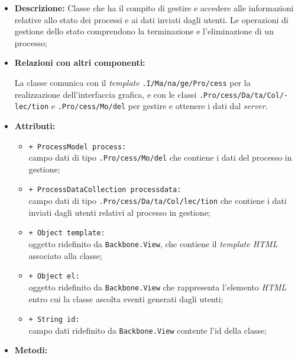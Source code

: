 \begin{flushleft}
\begin{itemize}
\item \textbf{Descrizione:} Classe che ha il compito di gestire e accedere alle informazioni relative allo stato dei processi e ai dati inviati dagli utenti. Le operazioni di gestione dello stato comprendono la terminazione e l'eliminazione di un processo;
\item \textbf{Relazioni con altri componenti:}
\begin{sloppypar}
La classe comunica con il \textit{template} \texttt{\viewAdmin{}.I\fshyp{}Ma\fshyp{}na\fshyp{}ge\fshyp{}Pro\fshyp{}cess} per la realizzazione dell'interfaccia grafica, e con le classi \texttt{\collection{}.Pro\fshyp{}cess\fshyp{}Da\fshyp{}ta\fshyp{}Col\fshyp{}lec\fshyp{}tion} e \texttt{\model{}.Pro\fshyp{}cess\fshyp{}Mo\fshyp{}del} per gestire e ottenere i dati dal \textit{server}.
\end{sloppypar}
\item \textbf{Attributi:}
\begin{sloppypar}
\begin{itemize}
\item \texttt{+ ProcessModel process:}\\ campo dati di tipo \texttt{\model{}.Pro\fshyp{}cess\fshyp{}Mo\fshyp{}del} che contiene i dati del processo in gestione;
\item \texttt{+ ProcessDataCollection processdata:}\\ campo dati di tipo \texttt{\collection{}.Pro\fshyp{}cess\fshyp{}Da\fshyp{}ta\fshyp{}Col\fshyp{}lec\fshyp{}tion} che contiene i dati inviati dagli utenti relativi al processo in gestione;
\item \texttt{+ Object template:}\\ oggetto ridefinito da \texttt{Backbone.View}, che contiene il \textit{template HTML} associato alla classe;
\item \texttt{+ Object el:}\\ oggetto ridefinito da \texttt{Backbone.View} che rappresenta l'elemento \textit{HTML} entro cui la classe ascolta eventi generati dagli utenti;
\item \texttt{+ String id:}\\ campo dati ridefinito da \texttt{Backbone.View} contente l'id della classe;
\end{itemize}
\end{sloppypar}
\item \textbf{Metodi:}
\begin{sloppypar}

\end{sloppypar}
\end{itemize}
\end{flushleft}

